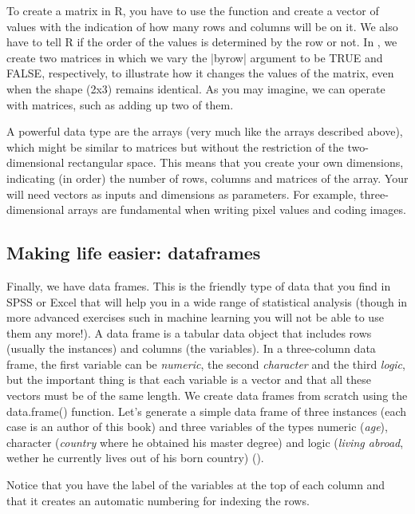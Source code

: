 To create a matrix in R, you have to use the function  and
create a vector of values with the indication of how many rows and
columns will be on it. We also have to tell R if the order of the
values is determined by the row or not. In , we create
two matrices in which we vary the |byrow| argument to be TRUE and
FALSE, respectively, to illustrate how it changes the values of the
matrix, even when the shape (2x3) remains identical. As you may
imagine, we can operate with matrices, such as adding up two of them.

A powerful data type are the arrays (very much like the 
arrays described above), which might be similar to matrices but
without the restriction of the two-dimensional rectangular space. This
means that you create your own dimensions, indicating (in order) the
number of rows, columns and matrices of the array. Your will need
vectors as inputs and dimensions as parameters. For example,
three-dimensional arrays are fundamental when writing pixel values and
coding images. 


\subsection{Making life easier: dataframes}

Finally, we have data frames. This is the friendly type
of data that you find in SPSS or Excel that will help you in a wide
range of statistical analysis (though in more advanced exercises such
in machine learning you will not be able to use them any more!).  A
data frame is a tabular data object that includes rows (usually the
instances) and columns (the variables). In a three-column data frame,
the first variable can be \emph{numeric}, the second \emph{character}
and the third \emph{logic}, but the important thing is that each
variable is a vector and that all these vectors must be of the same
length. We create data frames from scratch using the data.frame()
function.  Let’s generate a simple data frame of three instances (each
case is an author of this book) and three variables of the types
numeric (\emph{age}), character (\emph{country} where he obtained his
master degree) and logic (\emph{living abroad}, wether he currently
lives out of his born country) ().


Notice that you have the label of the variables at the top of each column and that it creates an automatic numbering for indexing the rows.  


